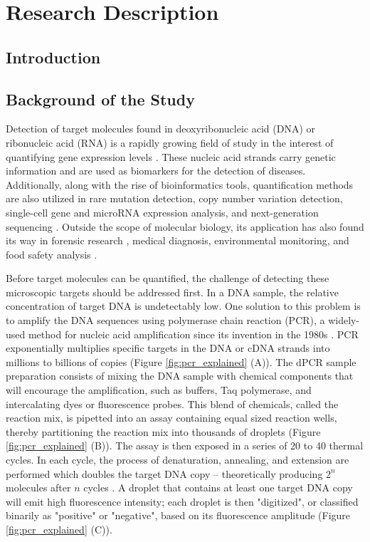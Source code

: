 \chapter{Research Description}
\label{sec:researchdesc} 

\section{Introduction}
\label{sec:introduction}

\section{Background of the Study}
\label{sec:backgroundstudy}

Detection of target molecules found in deoxyribonucleic acid (DNA) or ribonucleic acid (RNA) is a rapidly growing field of study in the interest of quantifying gene expression levels \cite{Huggett2015_PCR_NGS}. These nucleic acid strands carry genetic information and are used as biomarkers for the detection of diseases. Additionally, along with the rise of bioinformatics tools, quantification methods are also utilized in rare mutation detection, copy number variation detection, single-cell gene and microRNA expression analysis, and next-generation sequencing \cite{Quan2018}. Outside the scope of molecular biology, its application has also found its way in forensic research \cite{Whale2013}, medical diagnosis, environmental monitoring, and food safety analysis \cite{Cao2017}.


Before target molecules can be quantified, the challenge of detecting these microscopic targets should be addressed first. In a DNA sample, the relative concentration of target DNA is undetectably low. One solution to this problem is to amplify the DNA sequences using polymerase chain reaction (PCR), a widely-used method for nucleic acid amplification since its invention in the 1980s \cite{Cao2017}. PCR exponentially multiplies specific targets in the DNA or cDNA strands into millions to billions of copies (Figure \ref{fig:pcr_explained} (A)). The dPCR sample preparation consists of mixing the DNA sample with chemical components that will encourage the amplification, such as buffers, Taq polymerase, and intercalating dyes or fluorescence probes. This blend of chemicals, called the reaction mix, is pipetted into an assay containing equal sized reaction wells, thereby partitioning the reaction mix into thousands of droplets (Figure \ref{fig:pcr_explained} (B)). The assay is then exposed in a series of 20 to 40 thermal cycles. In each cycle, the process of denaturation, annealing, and extension are performed which doubles the target DNA copy -- theoretically producing \(2^n\) molecules after \(n\) cycles \cite{Quan2018}. A droplet that contains at least one target DNA copy will emit high fluorescence intensity; each droplet is then "digitized", or classified binarily as "positive" or "negative", based on its fluorescence amplitude (Figure \ref{fig:pcr_explained} (C)).

